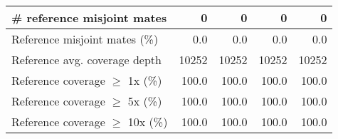 \documentclass[12pt,a4paper]{article}
\begin{document}
\begin{table}[ht]
\begin{center}
\begin{tabular}{|l*{4}{|r}|}
\# reference misjoint mates & 0 & 0 & 0 & 0 \\ \hline
Reference misjoint mates (\%) & 0.0 & 0.0 & 0.0 & 0.0 \\ \hline
Reference avg. coverage depth & 10252 & 10252 & 10252 & 10252 \\ \hline
Reference coverage $\geq$ 1x (\%) & 100.0 & 100.0 & 100.0 & 100.0 \\ \hline
Reference coverage $\geq$ 5x (\%) & 100.0 & 100.0 & 100.0 & 100.0 \\ \hline
Reference coverage $\geq$ 10x (\%) & 100.0 & 100.0 & 100.0 & 100.0 \\ \hline
\end{tabular}
\end{center}
\end{table}
\end{document}
